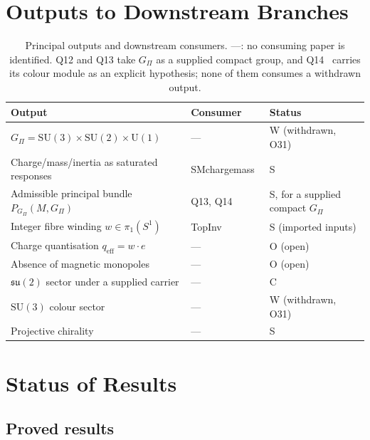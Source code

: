 \documentclass[11pt,a4paper]{article}
\theoremstyle{definition}
\newcommand{\SU}{\mathrm{SU}}
\newcommand{\su}{\mathfrak{su}}
\newcommand{\UU}{\mathrm{U}}
\newcommand{\Gpi}{G_{\Pi}}
\begin{document}
  \section{Outputs to Downstream Branches}
    \label{sec:outputs}

    \begin{table}[ht]
      \centering
      \caption{Principal outputs and downstream consumers.
      ---: no consuming paper is identified.
      Q12 and Q13 take $\Gpi$ as a supplied compact group, and Q14~\cite{Beau2026q14} carries
      its colour module as an explicit hypothesis; none of them consumes a withdrawn output.}
      \label{tab:outputs}
      \renewcommand{\arraystretch}{1.3}
      \begin{tabular}{@{}p{5.5cm}p{4.5cm}l@{}}
        \toprule
        Output & Consumer & Status \\
        \midrule
        $\Gpi = \SU(3) \times \SU(2) \times \UU(1)$ & --- & W (withdrawn, O31) \\
        Charge/mass/inertia as saturated responses & SMchargemass~\cite{Beau2026e} & S \\
        Admissible principal bundle $P_{\Gpi}(M, \Gpi)$ & Q13, Q14 & S, for a supplied compact $\Gpi$ \\
        Integer fibre winding $w \in \pi_1(S^1)$ & TopInv & S (imported inputs) \\
        Charge quantisation $q_{\mathrm{eff}} = w \cdot e$ & --- & O (open) \\
        Absence of magnetic monopoles & --- & O (open) \\
        $\su(2)$ sector under a supplied carrier & --- & C \\
        $\SU(3)$ colour sector & --- & W (withdrawn, O31) \\
        Projective chirality & --- & S \\
        \bottomrule
      \end{tabular}
    \end{table}

  \section{Status of Results}
    \label{sec:status}

    \subsection{Proved results}
      \label{sec:proved}
\end{document}
